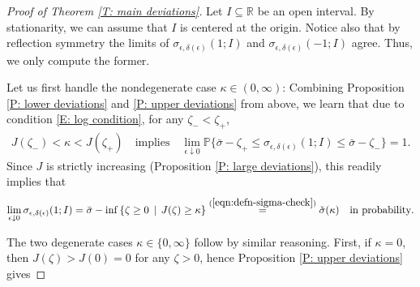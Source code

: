 \documentclass[12pt]{amsart}
\begin{document}
        \begin{proof}[Proof of Theorem \ref{T: main deviations}]
Let $I \subseteq \mathbb{R}$ be an open interval. By stationarity, we can assume that $I$ is centered at the origin.  Notice also that by reflection symmetry the limits of $ \sigma_{\epsilon,\delta(\epsilon)}(1; I ) $ and $ \sigma_{\epsilon,\delta(\epsilon)} (-1; I ) $ agree. Thus, we only compute the former. 

Let us first handle the nondegenerate case $ \kappa \in ( 0, \infty ) $: Combining Proposition \ref{P: lower deviations} and \ref{P: upper deviations} from above, we learn that due to condition \eqref{E: log condition}, for any $ \zeta_{ - } < \zeta_{ + } $,
%
\begin{align*}
	J ( \zeta_{ - } ) < \kappa < J ( \zeta_{ + } ) 	
	\quad \text{implies} \quad
	\lim_{ \epsilon \downarrow 0 } \mathbb{P} \{  \bar{\sigma} - \zeta_{ + } \leq \sigma_{\epsilon,\delta(\epsilon)}(1; I ) \leq \bar{\sigma} - \zeta_{ - } \} 
	= 1.
\end{align*}
%
Since $J$ is strictly increasing (Proposition \ref{P: large deviations}), this readily implies that
%
\begin{align*}
	 \lim_{ \epsilon \downarrow 0 } \sigma_{\epsilon,\delta(\epsilon)}(1; I )
	 = \bar \sigma - \inf \left\{ \zeta \geq 0 \, \mid \, J(\zeta) \geq \kappa \right\}
	 \stackrel{ (\ref{eqn:defn-sigma-check}) }{ = }  \check\sigma ( \kappa )
	\quad \text{in probability}.
\end{align*}
%

The two degenerate cases $ \kappa \in \{ 0 , \infty \} $ follow by similar reasoning.  First, if $\kappa = 0$, then $J(\zeta) > J(0) = 0$ for any $\zeta > 0$, hence Proposition \ref{P: upper deviations} gives
	 

\end{proof}
\end{document}
